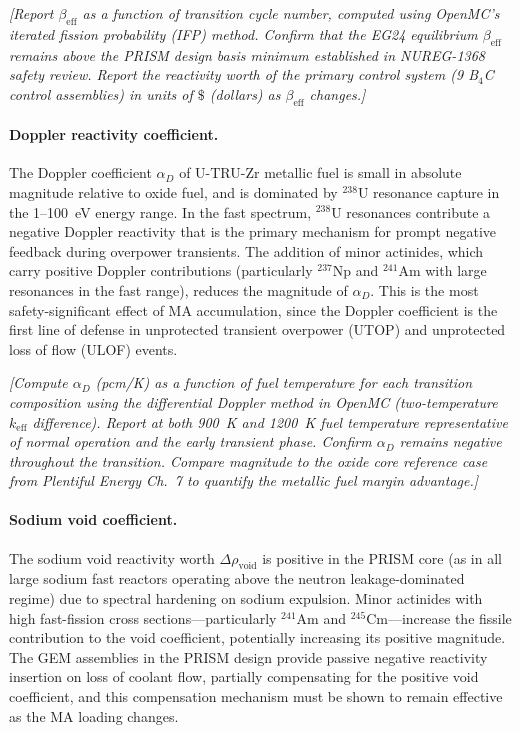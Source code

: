 \documentclass[10pt,twoside]{article}
\newcommand{\placeholder}[1]{%
  \textcolor{placeholder}{\textit{[#1]}}}
\begin{document}
\placeholder{Report $\beta_\text{eff}$ as a function of transition
  cycle number, computed using OpenMC's iterated fission probability
  (IFP) method.  Confirm that the EG24 equilibrium $\beta_\text{eff}$
  remains above the PRISM design basis minimum established in
  NUREG-1368 safety review.\cite{NRC1994}  Report the reactivity
  worth of the primary control system (9 B$_4$C control assemblies)
  in units of $\$$ (dollars) as $\beta_\text{eff}$ changes.}

\paragraph{Doppler reactivity coefficient.}
The Doppler coefficient $\alpha_D$ of U-TRU-Zr metallic fuel is
small in absolute magnitude relative to oxide fuel, and is
dominated by $^{238}$U resonance capture in the 1--100~eV
energy range.  In the fast spectrum, $^{238}$U resonances
contribute a negative Doppler reactivity that is the primary
mechanism for prompt negative feedback during overpower
transients.  The addition of minor actinides, which carry
positive Doppler contributions (particularly $^{237}$Np and
$^{241}$Am with large resonances in the fast range), reduces
the magnitude of $\alpha_D$.  This is the most safety-significant
effect of MA accumulation, since the Doppler coefficient is
the first line of defense in unprotected transient overpower
(UTOP) and unprotected loss of flow (ULOF) events.\cite{Till2011}

\placeholder{Compute $\alpha_D$ (pcm/K) as a function of fuel
  temperature for each transition composition using the differential
  Doppler method in OpenMC (two-temperature $k_\text{eff}$
  difference).  Report at both 900~K and 1200~K fuel temperature
  representative of normal operation and the early transient phase.
  Confirm $\alpha_D$ remains negative throughout the transition.
  Compare magnitude to the oxide core reference case from
  Plentiful Energy Ch.~7 to quantify the metallic fuel margin
  advantage.}

\paragraph{Sodium void coefficient.}
The sodium void reactivity worth $\Delta\rho_\text{void}$
is positive in the PRISM core (as in all large sodium fast
reactors operating above the neutron leakage-dominated regime)
due to spectral hardening on sodium expulsion.  Minor actinides
with high fast-fission cross sections---particularly $^{241}$Am
and $^{245}$Cm---increase the fissile contribution to the void
coefficient, potentially increasing its positive magnitude.
The GEM assemblies in the PRISM design provide passive negative
reactivity insertion on loss of coolant flow, partially
compensating for the positive void coefficient, and this
compensation mechanism must be shown to remain effective as
the MA loading changes.\cite{Till2011,Triplett2012}
\end{document}
